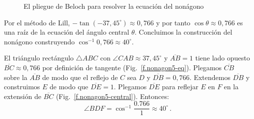 \begin{figure}[ht]
\begin{center}
\end{center}
\caption{El pliegue de Beloch para resolver la ecuación del nonágono}\label{f.nonagon3}
\end{figure}

Por el método de Lill, $-\tan (-37,45^\circ)\approx 0,766$ y por tanto $\cos \theta \approx 0,766$ es una raíz de la ecuación del ángulo central $\theta$. Concluimos la construcción del nonágono construyendo $\cos^{-1} 0,766\approx 40^\circ$.

El triángulo rectángulo $\triangle ABC$ con $\angle CAB\approx 37,45^\circ$ y $\overline{AB}=1$ tiene lado opuesto $\overline{BC}\approx 0,766$ por definición de tangente (Fig.~\ref{f.nonagon5-eq}).
Plegamos $\overline{CB}$ sobre la $\overline{AB}$ de modo que el reflejo de $C$ sea $D$ y $\overline{DB}=0,766$. Extendemos $\overline{DB}$ y construimos $E$ de modo que $\overline{DE}=1$.
Plegamos $\overline{DE}$ para reflejar $E$ en $F$ en la extensión de $\overline{BC}$ (Fig.~\ref{f.nonagon5-central}). Entonces:
\[
\angle BDF=\cos^{-1} \frac{0.766}{1}\approx 40^\circ\,.
\]

